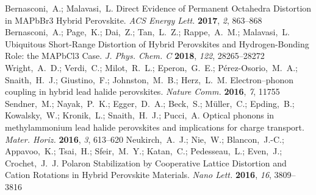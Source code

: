 \documentclass[journal=jpccck,manuscript=article,layout=twocolumn]{achemso}
\begin{document}
\begin{mcitethebibliography}{62}
Bernasconi,~A.; Malavasi,~L. Direct Evidence of Permanent Octahedra Distortion
  in MAPbBr3 Hybrid Perovskite. \emph{ACS Energy Lett.} \textbf{2017},
  \emph{2}, 863--868\relax
\mciteBstWouldAddEndPuncttrue
\mciteSetBstMidEndSepPunct{\mcitedefaultmidpunct}
{\mcitedefaultendpunct}{\mcitedefaultseppunct}\relax
\EndOfBibitem
{}
Bernasconi,~A.; Page,~K.; Dai,~Z.; Tan,~L.~Z.; Rappe,~A.~M.; Malavasi,~L.
  Ubiquitous Short-Range Distortion of Hybrid Perovskites and Hydrogen-Bonding
  Role: the MAPbCl3 Case. \emph{J. Phys. Chem. C} \textbf{2018}, \emph{122},
  28265--28272\relax
\mciteBstWouldAddEndPuncttrue
\mciteSetBstMidEndSepPunct{\mcitedefaultmidpunct}
{\mcitedefaultendpunct}{\mcitedefaultseppunct}\relax
\EndOfBibitem
{}
Wright,~A.~D.; Verdi,~C.; Milot,~R.~L.; Eperon,~G.~E.; P{\'e}rez-Osorio,~M.~A.;
  Snaith,~H.~J.; Giustino,~F.; Johnston,~M.~B.; Herz,~L.~M. Electron--phonon
  coupling in hybrid lead halide perovskites. \emph{Nature Comm.}
  \textbf{2016}, \emph{7}, 11755\relax
\mciteBstWouldAddEndPuncttrue
\mciteSetBstMidEndSepPunct{\mcitedefaultmidpunct}
{\mcitedefaultendpunct}{\mcitedefaultseppunct}\relax
\EndOfBibitem
{}
Sendner,~M.; Nayak,~P.~K.; Egger,~D.~A.; Beck,~S.; Müller,~C.; Epding,~B.;
  Kowalsky,~W.; Kronik,~L.; Snaith,~H.~J.; Pucci,~A.   Optical
  phonons in methylammonium lead halide perovskites and implications for charge
  transport. \emph{Mater. Horiz.} \textbf{2016}, \emph{3}, 613--620\relax
\mciteBstWouldAddEndPuncttrue
\mciteSetBstMidEndSepPunct{\mcitedefaultmidpunct}
{\mcitedefaultendpunct}{\mcitedefaultseppunct}\relax
\EndOfBibitem
{}
Neukirch,~A.~J.; Nie,~W.; Blancon,~J.-C.; Appavoo,~K.; Tsai,~H.; Sfeir,~M.~Y.;
  Katan,~C.; Pedesseau,~L.; Even,~J.; Crochet,~J.~J.   Polaron
  Stabilization by Cooperative Lattice Distortion and Cation Rotations in
  Hybrid Perovskite Materials. \emph{Nano Lett.} \textbf{2016}, \emph{16},
  3809--3816\relax
\mciteBstWouldAddEndPuncttrue
\mciteSetBstMidEndSepPunct{\mcitedefaultmidpunct}
{\mcitedefaultendpunct}{\mcitedefaultseppunct}\relax

\end{mcitethebibliography}
\end{document}
